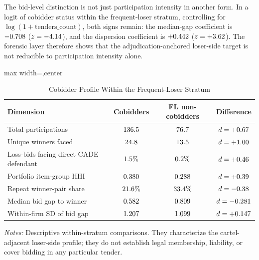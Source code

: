 The bid-level distinction is not just participation intensity in
another form. In a logit of cobidder status within the
frequent-loser stratum, controlling for
$\log(1+\text{tenders\_count})$, both signs remain: the
median-gap coefficient is $-0.708$
($z=-4.14$), and the dispersion coefficient is
$+0.442$ ($z=+3.62$). The forensic layer
therefore shows that the adjudication-anchored loser-side target
is not reducible to participation intensity alone.

\begin{table}[htbp]
\centering
\caption{Cobidder Profile Within the Frequent-Loser Stratum}
\label{tab:cobidder_signature_submission}
\footnotesize
\begin{adjustbox}{max width=\textwidth,center}
\begin{threeparttable}
\begin{tabular}{p{4.4cm}ccc}
\toprule
Dimension & Cobidders & FL non-cobidders & Difference \\
\midrule
Total participations & $136.5$ & $76.7$ & $d=+0.67$ \\
Unique winners faced & $24.8$ & $13.5$ & $d=+1.00$ \\
Loss-bids facing direct CADE defendant & $1.5\%$ & $0.2\%$ & $d=+0.46$ \\
Portfolio item-group HHI & $0.380$ & $0.288$ & $d=+0.39$ \\
Repeat winner-pair share & $21.6\%$ & $33.4\%$ & $d=-0.38$ \\
\midrule
Median bid gap to winner & $0.582$ & $0.809$ & $d=-0.281$ \\
Within-firm SD of bid gap & $1.207$ & $1.099$ & $d=+0.147$ \\
\bottomrule
\end{tabular}
\begin{tablenotes}
\footnotesize
\item \textit{Notes:} Descriptive within-stratum comparisons.
They characterize the cartel-adjacent loser-side profile; they
do not establish legal membership, liability, or cover bidding
in any particular tender.
\end{tablenotes}
\end{threeparttable}
\end{adjustbox}
\end{table}


